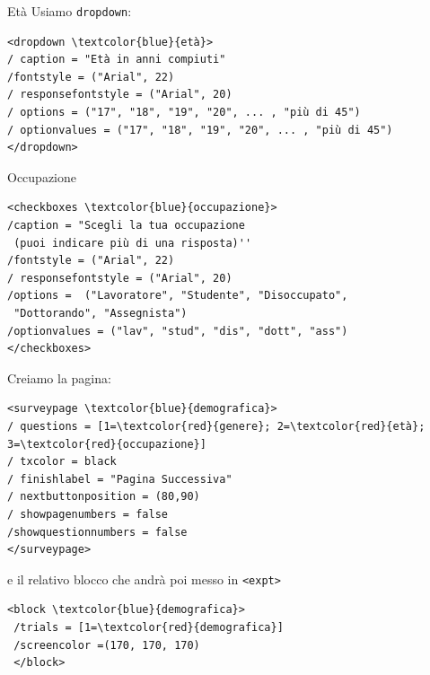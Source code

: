 \documentclass{beamer}
\begin{document}
\begin{frame}[fragile]{Età}
	Usiamo \texttt{dropdown}:
	\begin{small}
\begin{Verbatim}[commandchars=\\\{\}]
<dropdown \textcolor{blue}{età}>
/ caption = "Età in anni compiuti"
/fontstyle = ("Arial", 22)
/ responsefontstyle = ("Arial", 20)
/ options = ("17", "18", "19", "20", ... , "più di 45")
/ optionvalues = ("17", "18", "19", "20", ... , "più di 45")
</dropdown>
\end{Verbatim}
	\end{small}

\end{frame}

\begin{frame}[fragile]{Occupazione}
\begin{Verbatim}[commandchars=\\\{\}]
<checkboxes \textcolor{blue}{occupazione}>
/caption = "Scegli la tua occupazione 
 (puoi indicare più di una risposta)''
/fontstyle = ("Arial", 22)
/ responsefontstyle = ("Arial", 20)
/options =  ("Lavoratore", "Studente", "Disoccupato", 
 "Dottorando", "Assegnista")
/optionvalues = ("lav", "stud", "dis", "dott", "ass")
</checkboxes>
\end{Verbatim}
\end{frame}

\begin{frame}[fragile]
	Creiamo la pagina:
	\begin{Verbatim}[commandchars=\\\{\}]
<surveypage \textcolor{blue}{demografica}>
/ questions = [1=\textcolor{red}{genere}; 2=\textcolor{red}{età}; 3=\textcolor{red}{occupazione}] 
/ txcolor = black
/ finishlabel = "Pagina Successiva"
/ nextbuttonposition = (80,90)
/ showpagenumbers = false
/showquestionnumbers = false
</surveypage>
\end{Verbatim}

 e il relativo blocco che andrà poi messo in \texttt{<expt>}

\begin{Verbatim}[commandchars=\\\{\}]
 <block \textcolor{blue}{demografica}>
 /trials = [1=\textcolor{red}{demografica}]
 /screencolor =(170, 170, 170)
 </block>
\end{Verbatim}

\end{frame}
\end{document}
